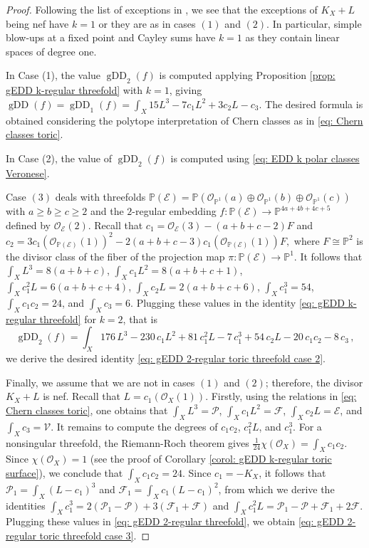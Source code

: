 \documentclass[11pt,reqno]{amsart}
\numberwithin{equation}{section}
\theoremstyle{plain}
\numberwithin{theorem}{section}
\theoremstyle{definition}
\renewcommand{\P}{\mathbb{P}}
\newcommand{\VV}{\mathcal{V}}
\newcommand{\EE}{\mathcal{E}}
\newcommand{\FF}{\mathcal{F}}
\newcommand{\OO}{\mathcal{O}}
\newcommand{\PP}{\mathcal{P}}
\newcommand{\gDD}{\operatorname{gDD}}
\begin{document}
\begin{proof}
Following the list of exceptions in \cite[A1]{polyhedralAdjunction}, we see that the exceptions of $K_X+L$ being nef have $k=1$ or they are as in cases $(1)$ and $(2)$. In particular, simple blow-ups at a fixed point and Cayley sums have $k=1$ as they contain linear spaces of degree one. 

In Case (1), the value $\gDD_2(f)$ is computed applying Proposition \ref{prop: gEDD k-regular threefold} with $k=1$, giving $\gDD(f)=\gDD_1(f) = \int_X 15L^3-7c_1L^2+3c_2L-c_3$. The desired formula is obtained considering the polytope interpretation of Chern classes as in \eqref{eq: Chern classes toric}.

In Case (2), the value of $\gDD_2(f)$ is computed using \eqref{eq: EDD k polar classes Veronese}. 

Case $(3)$ deals with threefolds $\P(\EE)=\P(\OO_{\P^1}(a)\oplus \OO_{\P^1}(b)\oplus\OO_{\P^1}(c))$ with $a\ge b\ge c\ge 2$ and the $2$-regular embedding $f\colon\P(\EE)\to\P^{4a+4b+4c+5}$ defined by $\OO_\EE(2)$. Recall that $c_1=\OO_\EE(3)-(a+b+c-2)F$ and $c_2=3c_1(\OO_{\P(\EE)}(1))^2-2(a+b+c-3)c_1(\OO_{\P(\EE)}(1))F,$ where $F\cong\P^2$ is the divisor class of the fiber of the projection map $\pi\colon\P(\EE)\to\P^1.$ It follows that $\int_X L^3 = 8(a+b+c)$, $\int_X c_1L^2 = 8(a+b+c+1)$, $\int_X c_1^2L = 6(a+b+c+4)$, $\int_X c_2L = 2(a+b+c+6)$, $\int_X c_1^3 = 54$, $\int_X c_1c_2 = 24$, and $\int_X c_3 = 6$. Plugging these values in the identity \eqref{eq: gEDD k-regular threefold} for $k=2$, that is
\begin{equation}\label{eq: gEDD 2-regular threefold}
\gDD_2(f) = \int_X 176\,L^3-230\,c_1L^2+81\,c_1^2L-7\,c_1^3+54\,c_2L-20\,c_1c_2-8\,c_3\,,
\end{equation}
we derive the desired identity \eqref{eq: gEDD 2-regular toric threefold case 2}.

Finally, we assume that we are not in cases $(1)$ and $(2)$; therefore, the divisor $K_X+L$ is nef.
Recall that $L=c_1(\OO_X(1))$. Firstly, using the relations in \eqref{eq: Chern classes toric}, one obtains that $\int_X L^3=\PP$, $\int_X c_1L^2=\FF$, $\int_X c_2L=\EE$, and $\int_X c_3=\VV$.
It remains to compute the degrees of $c_1c_2$, $c_1^2L$, and $c_1^3$.
For a nonsingular threefold, the Riemann-Roch theorem gives $\frac{1}{24}\chi(\OO_X)=\int_X c_1c_2.$ Since $\chi(\OO_X)=1$ (see the proof of Corollary \ref{corol: gEDD k-regular toric surface}), we conclude that $\int_X c_1c_2=24.$ Since $c_1=-K_X$, it follows that $\PP_1 = \int_X(L-c_1)^3$ and $\FF_1 = \int_X c_1(L-c_1)^2$, from which we derive the identities $\int_X c_1^3 = 2(\PP_1-\PP)+3(\FF_1+\FF)$ and $\int_X c_1^2L = \PP_1-\PP+\FF_1+2\FF$. Plugging these values in \eqref{eq: gEDD 2-regular threefold}, we obtain \eqref{eq: gEDD 2-regular toric threefold case 3}.
\end{proof}
\end{document}
